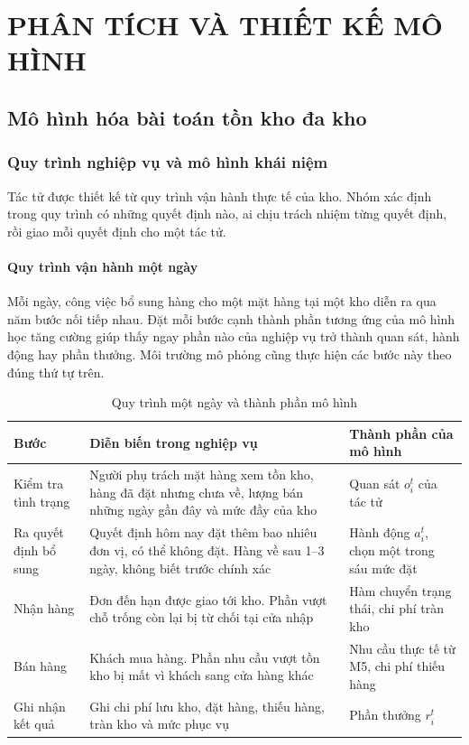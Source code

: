 ﻿\chapter{PHÂN TÍCH VÀ THIẾT KẾ MÔ HÌNH}
\label{chap:chapter3}

\section{Mô hình hóa bài toán tồn kho đa kho}
\label{sec:moHinhHoa}

\subsection{Quy trình nghiệp vụ và mô hình khái niệm}
\label{subsec:nghiepVu}

Tác tử được thiết kế từ quy trình vận hành thực tế của kho. Nhóm xác định trong quy trình có những quyết định nào, ai chịu trách nhiệm từng quyết định, rồi giao mỗi quyết định cho một tác tử.

\subsubsection{Quy trình vận hành một ngày}

Mỗi ngày, công việc bổ sung hàng cho một mặt hàng tại một kho diễn ra qua năm bước nối tiếp nhau. Đặt mỗi bước cạnh thành phần tương ứng của mô hình học tăng cường giúp thấy ngay phần nào của nghiệp vụ trở thành quan sát, hành động hay phần thưởng. Môi trường mô phỏng cũng thực hiện các bước này theo đúng thứ tự trên.

\begin{table}[H]
    \centering
    \caption{Quy trình một ngày và thành phần mô hình}
    \label{tab:quyTrinhNgay}
    \small
    \begin{tabular}{|>{\raggedright\arraybackslash}p{2.6cm}|>{\raggedright\arraybackslash}p{6.4cm}|>{\raggedright\arraybackslash}p{4.4cm}|}
        \hline
        Bước & Diễn biến trong nghiệp vụ & Thành phần của mô hình \\
        \hline
        Kiểm tra tình trạng & Người phụ trách mặt hàng xem tồn kho, hàng đã đặt nhưng chưa về, lượng bán những ngày gần đây và mức đầy của kho & Quan sát $o_i^t$ của tác tử \\ \hline
        Ra quyết định bổ sung & Quyết định hôm nay đặt thêm bao nhiêu đơn vị, có thể không đặt. Hàng về sau 1--3 ngày, không biết trước chính xác & Hành động $a_i^t$, chọn một trong sáu mức đặt \\ \hline
        Nhận hàng & Đơn đến hạn được giao tới kho. Phần vượt chỗ trống còn lại bị từ chối tại cửa nhập & Hàm chuyển trạng thái, chi phí tràn kho \\ \hline
        Bán hàng & Khách mua hàng. Phần nhu cầu vượt tồn kho bị mất vì khách sang cửa hàng khác & Nhu cầu thực tế từ M5, chi phí thiếu hàng \\ \hline
        Ghi nhận kết quả & Ghi chi phí lưu kho, đặt hàng, thiếu hàng, tràn kho và mức phục vụ & Phần thưởng $r_i^t$ \\
        \hline
    \end{tabular}
\end{table}


